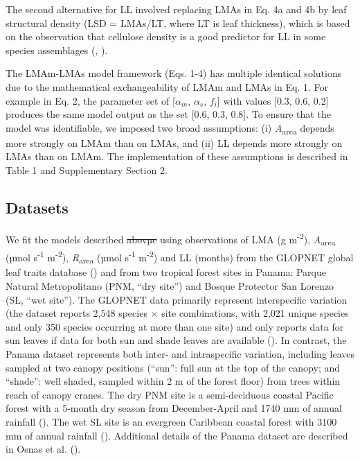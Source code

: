 \documentclass[
  12pt,
  letterpaper,
  DIV=11,
  numbers=noendperiod]{scrartcl}
\providecommand{\DIFadd}[1]{{\protect\color{blue}\uwave{#1}}} %
\providecommand{\DIFdel}[1]{{\protect\color{red}\sout{#1}}}                      %
\providecommand{\DIFaddbegin}{} %
\providecommand{\DIFaddend}{} %
\providecommand{\DIFdelbegin}{} %
\providecommand{\DIFdelend}{} %
\newcommand{\DIFscaledelfig}{0.5}
\newlength{\DIFdelgraphicswidth} %
\newlength{\DIFdelgraphicsheight} %
\newcommand{\DIFaddincludegraphics}[2][]{{\color{blue}\fbox{\DIFOincludegraphics[#1]{#2}}}} %
\newcommand{\DIFdelincludegraphics}[2][]{%
\sbox{\DIFdelgraphicsbox}{\DIFOincludegraphics[#1]{#2}}%
\settoboxwidth{\DIFdelgraphicswidth}{\DIFdelgraphicsbox} %
\settoboxtotalheight{\DIFdelgraphicsheight}{\DIFdelgraphicsbox} %
\scalebox{\DIFscaledelfig}{%
\parbox[b]{\DIFdelgraphicswidth}{\usebox{\DIFdelgraphicsbox}\\[-\baselineskip] \rule{\DIFdelgraphicswidth}{0em}}\llap{\resizebox{\DIFdelgraphicswidth}{\DIFdelgraphicsheight}{%
\setlength{\unitlength}{\DIFdelgraphicswidth}%
\begin{picture}(1,1)%
\thicklines\linethickness{2pt} %
{\color[rgb]{1,0,0}\put(0,0){\framebox(1,1){}}}%
{\color[rgb]{1,0,0}\put(0,0){\line( 1,1){1}}}%
{\color[rgb]{1,0,0}\put(0,1){\line(1,-1){1}}}%
\end{picture}%
}\hspace*{3pt}}} %
} %
\DeclareRobustCommand{\DIFaddbegin}{\DIFOaddbegin \let\includegraphics\DIFaddincludegraphics} %
\DeclareRobustCommand{\DIFaddend}{\DIFOaddend \let\includegraphics\DIFOincludegraphics} %
\DeclareRobustCommand{\DIFdelbegin}{\DIFOdelbegin \let\includegraphics\DIFdelincludegraphics} %
\DeclareRobustCommand{\DIFdelend}{\DIFOaddend \let\includegraphics\DIFOincludegraphics} %
\begin{document}
The second alternative for LL involved replacing LMAs in Eq. 4a and 4b
by leaf structural density (LSD = LMAs/LT, where LT is leaf thickness),
which is based on the observation that cellulose density is a good
predictor for LL in some species assemblages
(,
).

The LMAm-LMAs model framework (Eqs. 1-4) has multiple identical
solutions due to the mathematical exchangeability of LMAm and LMAs in
Eq. 1. For example in Eq. 2, the parameter set of {[}\(\alpha_m\),
\(\alpha_s\), \(f_i\){]} with values {[}0.3, 0.6, 0.2{]} produces the
same model output as the set {[}0.6, 0.3, 0.8{]}. To ensure that the
model was identifiable, we imposed two broad assumptions: (i)
\emph{A}\textsubscript{area} depends more strongly on LMAm than on LMAs,
and (ii) LL depends more strongly on LMAs than on LMAm. The
implementation of these assumptions is described in Table 1 and
Supplementary Section 2.

\subsection{Datasets}\label{datasets}

We fit the models described \DIFdelbegin \DIFdel{abovµe }\DIFdelend \DIFaddbegin \DIFadd{above }\DIFaddend using observations of LMA (g
m\textsuperscript{-2}), \emph{A}\textsubscript{area} (µmol
s\textsuperscript{-1} m\textsuperscript{-2}),
\emph{R}\textsubscript{area} (µmol s\textsuperscript{-1}
m\textsuperscript{-2}) and LL (months) from the GLOPNET global leaf
traits database () and
from two tropical forest sites in Panama: Parque Natural Metropolitano
(PNM, ``dry site'') and Bosque Protector San Lorenzo (SL, ``wet site'').
The GLOPNET data primarily represent interspecific variation (the
dataset reports 2,548 species \(\times\) site combinations, with 2,021
unique species and only 350 species occurring at more than one site) and
only reports data for sun leaves if data for both sun and shade leaves
are available (). In
contrast, the Panama dataset represents both inter- and intraspecific
variation, including leaves sampled at two canopy positions (``sun'':
full sun at the top of the canopy; and ``shade'': well shaded, sampled
within 2 m of the forest floor) from trees within reach of canopy
cranes. The dry PNM site is a semi-deciduous coastal Pacific forest with
a 5-month dry season from December-April and 1740 mm of annual rainfall
(). The wet SL site is an
evergreen Caribbean coastal forest with 3100 mm of annual rainfall
(). Additional details of
the Panama dataset are described in Osnas et al.
().
\end{document}
